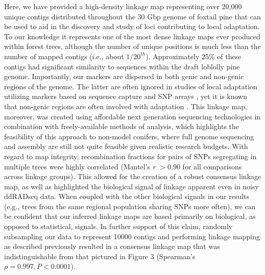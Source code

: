 \documentclass[smallextended]{svjour3}
\begin{document}
Here, we have provided a high-density linkage map representing over 20,000 unique
contigs distributed throughout the 30 Gbp genome of foxtail pine that can be
used to aid in the discovery and study of loci contributing to local
adaptation. To our knowledge it represents one of the most dense linkage maps
ever produced within forest trees, although the number of unique positions is
much less than the number of mapped contigs (i.e., about
$1/20^{th}$). Approximately 25\% of these contigs had significant similarity to
sequences within the draft loblolly pine genome. Importantly, our markers are
dispersed in both genic and non-genic regions of the genome. The latter are
often ignored in studies of local adaptation utilizing markers based on sequence
capture \citep[e.g.,][]{Neves:2014} and SNP arrays
\citep[e.g.,][]{Eckert:2010a}, yet it is known that non-genic regions are often involved with adaptation \citep[e.g.,][]{Studer:2011}.
This linkage map, moreover, was created using
affordable next generation sequencing technologies in combination with freely-available
methods of analysis, which highlights the feasibility of this approach to
non-model conifers, where full genome sequencing and assembly are still not quite
feasible given realistic research budgets.  With regard to map integrity,
recombination fractions for pairs of SNPs segregating in multiple trees were
highly correlated (Mantel's \textit{r} $> 0.90$ for all comparisons across
linkage groups).  This allowed for the creation of a robust consensus linkage
map, as well as highlighted the biological signal of linkage apparent even in
noisy ddRADseq data. When coupled with the other biological signals in our
results (e.g., trees from the same regional population sharing SNPs more often),
we can be confident that our inferred linkage maps are based primarily on
biological, as opposed to statistical, signals. In further support of this
claim, randomly subsampling our data to represent \num{10000} contigs and performing
linkage mapping as described previously resulted in a consensus linkage map that
was indistinguishable from that pictured in Figure $3$ (Spearman's $\rho =
0.997, P < 0.0001$).
\end{document}
